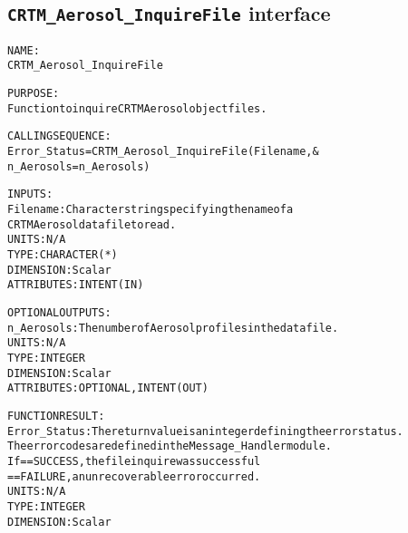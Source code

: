 \subsection{\texttt{CRTM\_Aerosol\_InquireFile} interface}
  \label{sec:CRTM_Aerosol_InquireFile_interface}
  \begin{alltt}
 
  NAME:
        CRTM_Aerosol_InquireFile
 
  PURPOSE:
        Function to inquire CRTM Aerosol object files.
 
  CALLING SEQUENCE:
        Error_Status = CRTM_Aerosol_InquireFile( Filename               , &
                                                 n_Aerosols = n_Aerosols  )
 
  INPUTS:
        Filename:       Character string specifying the name of a
                        CRTM Aerosol data file to read.
                        UNITS:      N/A
                        TYPE:       CHARACTER(*)
                        DIMENSION:  Scalar
                        ATTRIBUTES: INTENT(IN)
 
  OPTIONAL OUTPUTS:
        n_Aerosols:     The number of Aerosol profiles in the data file.
                        UNITS:      N/A
                        TYPE:       INTEGER
                        DIMENSION:  Scalar
                        ATTRIBUTES: OPTIONAL, INTENT(OUT)
 
  FUNCTION RESULT:
        Error_Status:   The return value is an integer defining the error status.
                        The error codes are defined in the Message_Handler module.
                        If == SUCCESS, the file inquire was successful
                           == FAILURE, an unrecoverable error occurred.
                        UNITS:      N/A
                        TYPE:       INTEGER
                        DIMENSION:  Scalar
 
  \end{alltt}
